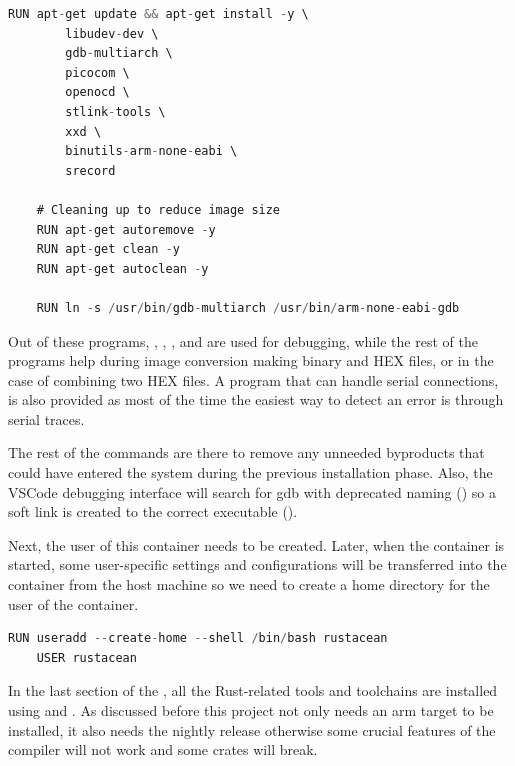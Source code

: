 \begin{lstlisting}[language=C,frame=single,float=!ht,label={lst:docker-apt},caption={Installing External Dependencies}]
    RUN apt-get update && apt-get install -y \
        libudev-dev \
        gdb-multiarch \
        picocom \
        openocd \
        stlink-tools \
        xxd \
        binutils-arm-none-eabi \
        srecord

    # Cleaning up to reduce image size
    RUN apt-get autoremove -y
    RUN apt-get clean -y
    RUN apt-get autoclean -y

    RUN ln -s /usr/bin/gdb-multiarch /usr/bin/arm-none-eabi-gdb
\end{lstlisting}

Out of these programs, , , , and  are used for debugging, while the rest of the programs help during image conversion making binary and HEX files, or in the case of  combining two HEX files. A program that can handle serial connections,  is also provided as most of the time the easiest way to detect an error is through serial traces.

The rest of the  commands are there to remove any unneeded byproducts that could have entered the system during the previous installation phase. Also, the VSCode debugging interface will search for gdb with deprecated naming () so a soft link is created to the correct executable ().

Next, the user of this container needs to be created. Later, when the container is started, some user-specific settings and configurations will be transferred into the container from the host machine so we need to create a home directory for the user of the container.

\begin{lstlisting}[language=C,frame=single,float=!ht,label={lst:docker-user},caption={Creating a User for the Container}]
    RUN useradd --create-home --shell /bin/bash rustacean
    USER rustacean
\end{lstlisting}

In the last section of the , all the Rust-related tools and toolchains are installed using  and . As discussed before this project not only needs an arm target to be installed, it also needs the nightly release otherwise some crucial features of the compiler will not work and some crates will break.

